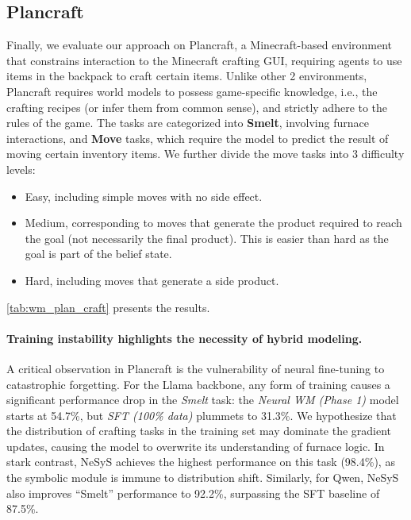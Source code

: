 \documentclass{article}
\theoremstyle{plain}
\theoremstyle{definition}
\theoremstyle{remark}
\newcommand{\ours}{{\sc NeSyS}\xspace}
\begin{document}
\subsection{Plancraft}\label{sec:Plancraft}
Finally, we evaluate our approach on Plancraft, a Minecraft-based environment that constrains interaction to the Minecraft crafting GUI, requiring agents to use items in the backpack to craft certain items. Unlike other 2 environments, Plancraft requires world models to possess game-specific knowledge, i.e., the crafting recipes (or infer them from common sense), and strictly adhere to the rules of the game. The tasks are categorized into \textbf{Smelt}, involving furnace interactions, and \textbf{Move} tasks, which require the model to predict the result of moving certain inventory items. We further divide the move tasks into 3 difficulty levels: 
\begin{itemize}
    \item Easy, including simple moves with no side effect.
    \item Medium, corresponding to moves that generate the product required to reach the goal (not necessarily the final product). This is easier than hard as the goal is part of the belief state.
    \item Hard, including moves that generate a side product.
\end{itemize}
\cref{tab:wm_plan_craft} presents the results.

\paragraph{Training instability highlights the necessity of hybrid modeling.} A critical observation in Plancraft is the vulnerability of neural fine-tuning to catastrophic forgetting. For the Llama backbone, any form of training causes a significant performance drop in the \textit{Smelt} task: the \textit{Neural WM (Phase 1)} model starts at 54.7\%, but \textit{SFT (100\% data)} plummets to 31.3\%. We hypothesize that the distribution of crafting tasks in the training set may dominate the gradient updates, causing the model to overwrite its understanding of furnace logic. In stark contrast, \ours achieves the highest performance on this task (98.4\%), as the symbolic module is immune to distribution shift. Similarly, for Qwen, \ours also improves ``Smelt'' performance to 92.2\%, surpassing the SFT baseline of 87.5\%.
\end{document}
